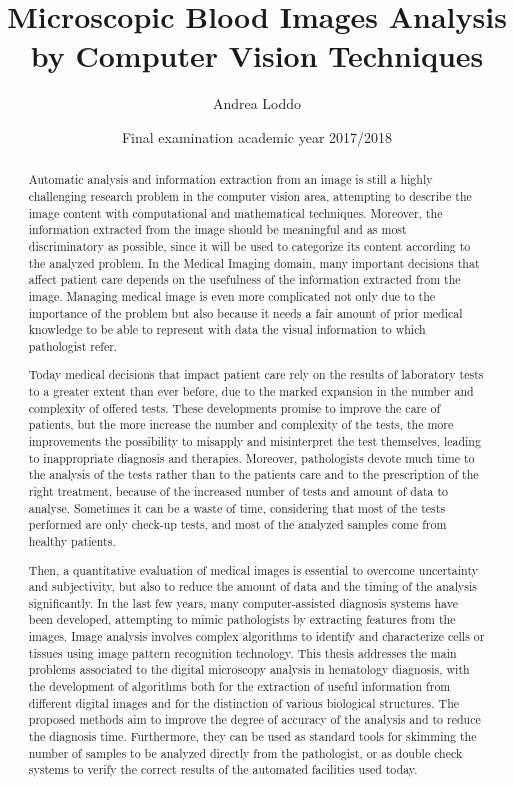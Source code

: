 \documentclass[final,a4paper,12pt,english]{UnicaPhdThesis3}
\title{Microscopic Blood Images Analysis by Computer Vision Techniques}
\author{Andrea Loddo}
\date{Final examination academic year 2017/2018}
\begin{document}
\maketitle

\begin{abstract}
Automatic analysis and information extraction from an image is still a highly challenging research problem in the computer vision area, attempting to describe the image content with computational and mathematical techniques. Moreover, the information extracted from the image should be meaningful and as most discriminatory as possible, since it will be used to categorize its content according to the analyzed problem. In the Medical Imaging domain, many important decisions that affect patient care depends on the usefulness of the information extracted from the image. Managing medical image is even more complicated not only due to the importance of the problem but also because it needs a fair amount of prior medical knowledge to be able to represent with data the visual information to which pathologist refer. 

Today medical decisions that impact patient care rely on the results of laboratory tests to a greater extent than ever before, due to the marked expansion in the number and complexity of offered tests. These developments promise to improve the care of patients, but the more increase the number and complexity of the tests, the more improvements the possibility to misapply and misinterpret the test themselves, leading to inappropriate diagnosis and therapies.  Moreover, pathologists devote much time to the analysis of the tests rather than to the patients care and to the prescription of the right treatment, because of the increased number of tests and amount of data to analyse. Sometimes it can be a waste of time, considering that most of the tests performed are only check-up tests, and most of the analyzed samples come from healthy patients.

Then, a quantitative evaluation of medical images is essential to overcome uncertainty and subjectivity, but also to reduce the amount of data and the timing of the analysis significantly. In the last few years, many computer-assisted diagnosis systems have been developed, attempting to mimic pathologists by extracting features from the images. Image analysis involves complex algorithms to identify and characterize cells or tissues using image pattern recognition technology. This thesis addresses the main problems associated to the digital microscopy analysis in hematology diagnosis, with the development of algorithms both for the extraction of useful information from different digital images and for the distinction of various biological structures. The proposed methods aim to improve the degree of accuracy of the analysis and to reduce the diagnosis time. Furthermore, they can be used as standard tools for skimming the number of samples to be analyzed directly from the pathologist, or as double check systems to verify the correct results of the automated facilities used today.
\end{abstract}
\end{document}
